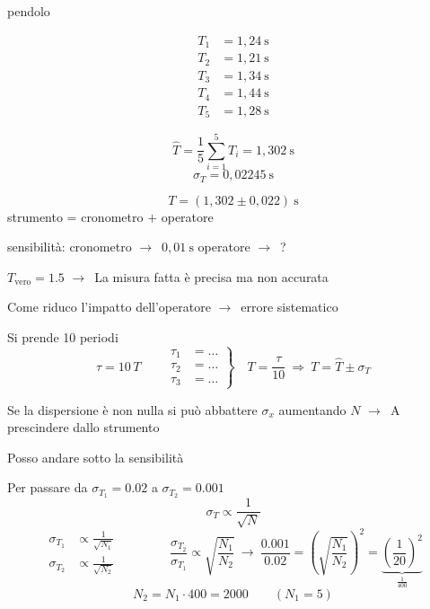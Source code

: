 \documentclass[11pt,a4paper,oneside]{book}
\newcommand{\fr}{\ensuremath{\rightarrow}}
\begin{document}
\begin{esercizio}{pendolo}{}
\leavevmode\par
\begin{minipage}[c]{0.3\linewidth}
\[
  \begin{aligned}
    T_1 &= 1{,}24\ \mathrm{s} \\
    T_2 &= 1{,}21\ \mathrm{s} \\
    T_3 &= 1{,}34\ \mathrm{s} \\
    T_4 &= 1{,}44\ \mathrm{s} \\
    T_5 &= 1{,}28\ \mathrm{s}
  \end{aligned}
\]
\end{minipage}\hfill
\begin{minipage}[c]{0.6\linewidth}
\[
  \hat{T} = \frac{1}{5} \sum_{i=1}^{5} T_i = 1{,}302\ \mathrm{s}
\]
\[
  \sigma_T = 0{,}02245\ \mathrm{s}
\]
\end{minipage}
\[
  T = (1{,}302 \pm 0{,}022)\ \mathrm{s}
\]
strumento = cronometro $+$ operatore

sensibilità: \quad cronometro \fr\ $0{,}01\ \mathrm{s}$ \qquad operatore \fr\ ?

$T_{\text{vero}} = 1.5$ \fr\ La misura fatta è precisa ma non accurata

Come riduco l'impatto dell'operatore \fr\ errore sistematico

Si prende 10 periodi
\[
  \tau = 10\,T \qquad
  \left.
  \begin{aligned}
    \tau_1 &= \ldots \\
    \tau_2 &= \ldots \\
    \tau_3 &= \ldots
  \end{aligned}
  \right\}
  \quad T = \frac{\tau}{10} \ \Rightarrow\ T = \hat{T} \pm \sigma_T
\]
\end{esercizio}

\begin{attenzione}[NB!]
Se la dispersione è non nulla si può abbattere $\sigma_x$ aumentando $N$ \fr\ A prescindere dallo strumento

Posso andare sotto la sensibilità
\end{attenzione}

Per passare da $\sigma_{T_1} = 0.02$ a $\sigma_{T_2} = 0.001$
\[
  \sigma_T \propto \frac{1}{\sqrt{N}}
\]
\[
  \begin{aligned}
    \sigma_{T_1} &\propto \frac{1}{\sqrt{N_1}} \\
    \sigma_{T_2} &\propto \frac{1}{\sqrt{N_2}}
  \end{aligned}
  \qquad\qquad
  \frac{\sigma_{T_2}}{\sigma_{T_1}} \propto \sqrt{\frac{N_1}{N_2}}
  \ \to\
  \frac{0.001}{0.02} = \left( \sqrt{\frac{N_1}{N_2}} \right)^{2} = \underbrace{\left( \frac{1}{20} \right)^{2}}_{\frac{1}{400}}
\]
\[
  N_2 = N_1 \cdot 400 = 2000 \qquad (N_1 = 5)
\]
\end{document}
